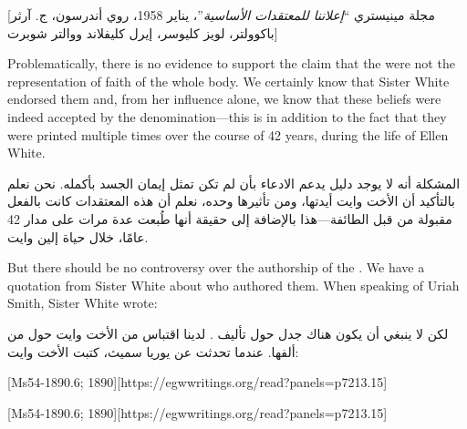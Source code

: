 [مجلة مينيستري “\textit{إعلاننا للمعتقدات الأساسية}”، يناير 1958، روي أندرسون، ج. آرثر باكوولتر، لويز كليوسر، إيرل كليفلاند ووالتر شوبرت]


Problematically, there is no evidence to support the claim that the  were not the representation of faith of the whole body. We certainly know that Sister White endorsed them and, from her influence alone, we know that these beliefs were indeed accepted by the denomination—this is in addition to the fact that they were printed multiple times over the course of 42 years, during the life of Ellen White.


المشكلة أنه لا يوجد دليل يدعم الادعاء بأن  لم تكن تمثل إيمان الجسد بأكمله. نحن نعلم بالتأكيد أن الأخت وايت أيدتها، ومن تأثيرها وحده، نعلم أن هذه المعتقدات كانت بالفعل مقبولة من قبل الطائفة—هذا بالإضافة إلى حقيقة أنها طُبعت عدة مرات على مدار 42 عامًا، خلال حياة إلين وايت.


But there should be no controversy over the authorship of the . We have a quotation from Sister White about who authored them. When speaking of Uriah Smith, Sister White wrote:


لكن لا ينبغي أن يكون هناك جدل حول تأليف . لدينا اقتباس من الأخت وايت حول من ألفها. عندما تحدثت عن يوريا سميث، كتبت الأخت وايت:


[Ms54-1890.6; 1890][https://egwwritings.org/read?panels=p7213.15]


[Ms54-1890.6; 1890][https://egwwritings.org/read?panels=p7213.15]


